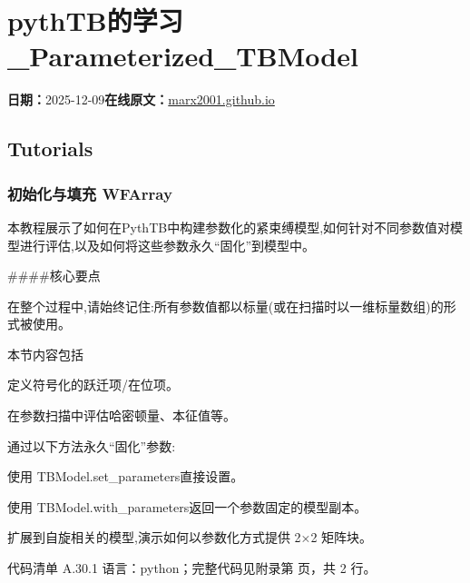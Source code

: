 \documentclass[lang=cn,scheme=chinese,color=blue,device=normal,toc=onecol,math=cm]{elegantbook}
\begin{document}
\section{pythTB的学习\_\allowbreak{}Parameterized\_\allowbreak{}TBModel}
\begin{articlemeta}
\textbf{日期：}2025-12-09\hfill\textbf{在线原文：}\href{https://marx2001.github.io/sci-note\_posts/20251209-Parameterized\_TBModel}{marx2001.github.io}
\end{articlemeta}

\subsection{Tutorials}


\subsubsection{初始化与填充 WFArray}


本教程展示了如何在PythTB中构建参数化的紧束缚模型,如何针对不同参数值对模型进行评估,以及如何将这些参数永久“固化”到模型中。\par


\#\#\#\#核心要点\par


在整个过程中,请始终记住:所有参数值都以标量(或在扫描时以一维标量数组)的形式被使用。\par


本节内容包括\par


定义符号化的跃迁项/\allowbreak{}在位项。\par


在参数扫描中评估哈密顿量、本征值等。\par


通过以下方法永久“固化”参数:\par


使用 TBModel.set\_\allowbreak{}parameters直接设置。\par


使用 TBModel.with\_\allowbreak{}parameters返回一个参数固定的模型副本。\par


扩展到自旋相关的模型,演示如何以参数化方式提供 2×2 矩阵块。\par


\begin{codeindexbox}{代码清单 A.30.1}
语言：python；完整代码见附录第 \pageref{code:30:1} 页，共 2 行。
\end{codeindexbox}
\end{document}

